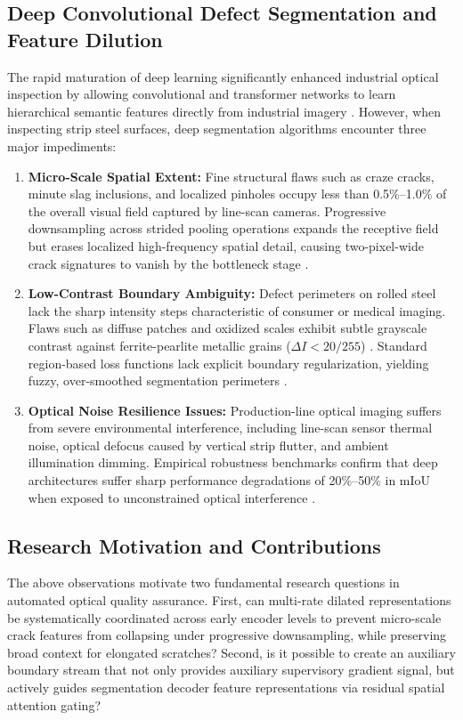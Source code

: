 \documentclass{ieeeaccess}
\begin{document}
\subsection{Deep Convolutional Defect Segmentation and Feature Dilution}
\label{sec:intro_deep_limits}
The rapid maturation of deep learning significantly enhanced industrial optical inspection by allowing convolutional and transformer networks to learn hierarchical semantic features directly from industrial imagery \cite{survey2020, li2024ef2net}. However, when inspecting strip steel surfaces, deep segmentation algorithms encounter three major impediments:
\begin{enumerate}
    \item \textbf{Micro-Scale Spatial Extent:} Fine structural flaws such as craze cracks, minute slag inclusions, and localized pinholes occupy less than 0.5\%--1.0\% of the overall visual field captured by line-scan cameras. Progressive downsampling across strided pooling operations expands the receptive field but erases localized high-frequency spatial detail, causing two-pixel-wide crack signatures to vanish by the bottleneck stage \cite{zhang2024gnapsc, chen2018deeplabv3plus}.
    \item \textbf{Low-Contrast Boundary Ambiguity:} Defect perimeters on rolled steel lack the sharp intensity steps characteristic of consumer or medical imaging. Flaws such as diffuse patches and oxidized scales exhibit subtle grayscale contrast against ferrite-pearlite metallic grains ($\Delta I < 20/255$) \cite{krassnig2025ispad, yao2024fewshot}. Standard region-based loss functions lack explicit boundary regularization, yielding fuzzy, over-smoothed segmentation perimeters \cite{wang2025bahrnet, alghamdi2024potholebaf}.
    \item \textbf{Optical Noise Resilience Issues:} Production-line optical imaging suffers from severe environmental interference, including line-scan sensor thermal noise, optical defocus caused by vertical strip flutter, and ambient illumination dimming. Empirical robustness benchmarks confirm that deep architectures suffer sharp performance degradations of 20\%--50\% in mIoU when exposed to unconstrained optical interference \cite{song2013neu, hecklerkram2025mvtecad2}.
\end{enumerate}

\subsection{Research Motivation and Contributions}
\label{sec:intro_contributions}
The above observations motivate two fundamental research questions in automated optical quality assurance. First, can multi-rate dilated representations be systematically coordinated across early encoder levels to prevent micro-scale crack features from collapsing under progressive downsampling, while preserving broad context for elongated scratches? Second, is it possible to create an auxiliary boundary stream that not only provides auxiliary supervisory gradient signal, but actively guides segmentation decoder feature representations via residual spatial attention gating?
\end{document}
